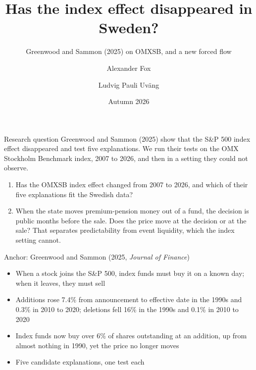 \documentclass[aspectratio=169]{beamer}
\title[Finance Thesis Fall 26]{Has the index effect disappeared in Sweden?}
\subtitle{Greenwood and Sammon (2025) on OMXSB, and a new forced flow}
\author[Alexander Fox \& Ludvig P Uväng]{Alexander Fox \and Ludvig Pauli Uväng}
\institute{Stockholm School of Economics}
\date{Autumn 2026}
\begin{document}
\maketitle

\begin{frame}{Research question}
  Greenwood and Sammon (2025) show that the S\&P 500 index effect disappeared and
  test five explanations. We run their tests on the OMX Stockholm Benchmark index,
  2007 to 2026, and then in a setting they could not observe.

  \bigskip
  \begin{enumerate}
    \item Has the OMXSB index effect changed from 2007 to 2026, and which of their
      five explanations fit the Swedish data?
    \item When the state moves premium-pension money out of a fund, the decision is
      public months before the sale. Does the price move at the decision or at the
      sale? That separates predictability from event liquidity, which the index
      setting cannot.
  \end{enumerate}
\end{frame}

\begin{frame}{Anchor: Greenwood and Sammon (2025, \emph{Journal of Finance})}
  \begin{itemize}
    \item When a stock joins the S\&P 500, index funds must buy it on a known day;
      when it leaves, they must sell
    \item Additions rose 7.4\% from announcement to effective date in the 1990s and
      0.3\% in 2010 to 2020; deletions fell 16\% in the 1990s and 0.1\% in 2010 to 2020
    \item Index funds now buy over 6\% of shares outstanding at an addition, up from
      almost nothing in 1990, yet the price no longer moves
    \item Five candidate explanations, one test each
  \end{itemize}
\end{frame}
\end{document}
